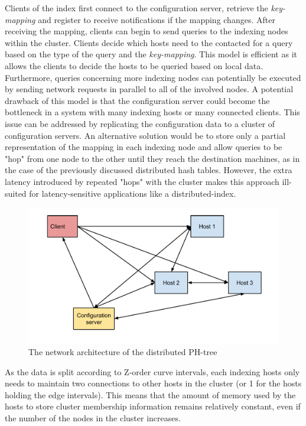 \documentclass[11pt,a4paper]{globis-book}
\begin{document}
Clients of the index first connect to the configuration server, retrieve the \textit{key-mapping} and register to receive notifications if the mapping changes. After receiving the mapping, clients can begin to send queries to the indexing nodes within the cluster. Clients decide which hosts need to the contacted for a query based on the type of the query and the \textit{key-mapping}. This model is efficient as it allows the clients to decide the hosts to be queried based on local data. Furthermore, queries concerning more indexing nodes can potentially be executed by sending network requests in parallel to all of the involved nodes. A potential drawback of this model is that the configuration server could become the bottleneck in a system with many indexing hosts or many connected clients. This issue can be addressed by replicating the configuration data to a cluster of configuration servers. An alternative solution would be to store only a partial representation of the mapping in each indexing node and allow queries to be "hop" from one node to the other until they reach the destination machines, as in the case of the previously discussed distributed hash tables. However, the extra latency introduced by repeated "hops" with the cluster makes this approach ill-suited for latency-sensitive applications like a distributed-index.  

\begin{figure}[t]
    \centering 
    \includegraphics[scale=0.6]{images/architecture}
    \caption{The network architecture of the distributed PH-tree}
    \label{fig:architecture}
\end{figure}

As the data is split according to Z-order curve intervals, each indexing hosts only needs to maintain two connections to other hosts in the cluster (or 1 for the hosts holding the edge intervals). This means that the amount of memory used by the hosts to store cluster membership information remains relatively constant, even if the number of the nodes in the cluster increases. 
\end{document}
